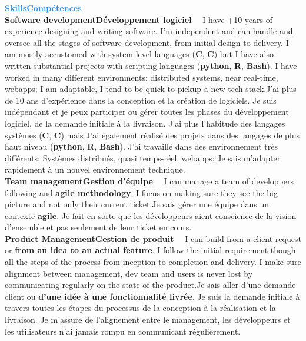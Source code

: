 \documentclass[a4paper]{article}
\newcommand\enfr[2]{\ifdefined\doen#1\else#2\fi\xspace}
\newcommand\cpplang{\textbf{C\raisebox{0.1em}{++}}\xspace}
\newcommand\clang{\textbf{C}\xspace}
\newcommand\rlang{\textbf{R}\xspace}
\newcommand\python{\textbf{python}\xspace}
\newcommand\bash{\textbf{Bash}\xspace}
\newcommand\heading[1]{\Large\textsf{\textbf{\textcolor{DodgerBlue}{#1}}}\normalsize}
\newcommand\sideentry[1]{\normalsize\textbf{#1}~~}
\begin{document}
\begin{minipage}[t]{0.29\textwidth}
  \heading{\enfr{Skills}{Compétences}}\\

  \sideentry{\enfr{Software development}{Développement logiciel}}
  \enfr{I have +10 years of experience designing and writing
    software. I'm independent and can handle and oversee all the
    stages of software development, from initial design to delivery. I
    am mostly accustomed with system-level languages (\clang,
    \cpplang) but I have also written substantial projects with
    scripting languages (\python, \rlang, \bash). I have worked in
    many different environments: distributed systems, near real-time,
    webapps; I am adaptable, I tend to be quick to pickup a new tech
    stack.}
    {J'ai plus de 10 ans d’expérience dans la conception et
    la création de logiciels. Je suis indépendant et je peux
    participer ou gérer toutes les phases du développement logiciel,
    de la demande initiale à la livraison. J'ai plus l'habitude des
    langages systèmes (\clang, \cpplang) mais J'ai également réalisé
    des projets dans des langages de plus haut niveau (\python, \rlang,
    \bash). J'ai travaillé dans des environnement très différents:
    Systèmes distribués, quasi temps-réel, webapps; Je sais m'adapter
    rapidement à un nouvel environnement technique.}\\

    \sideentry{\enfr{Team management}{Gestion d'équipe}}
    \enfr{I can manage a team of developpers
  following and \textbf{agile methodology}; I focus on making sure
  they see the big picture and not only their current ticket.}
    {Je sais gérer une équipe dans un contexte \textbf{agile}. Je
      fait en sorte que les développeurs aient conscience de la
      vision d'ensemble et pas seulement de leur ticket en cours.}\\
 
    \sideentry{\enfr{Product Management}{Gestion de produit}}
    \enfr{I can build from a client
  request or \textbf{from an idea to an actual feature}. I follow the
  initial requirement though all the steps of the process from
  inception to completion and delivery. I make sure alignment between
  management, dev team and users is never lost by communicating
  regularly on the state of the product.}
    {Je sais aller d'une demande client ou \textbf{d'une idée à une
        fonctionnalité livrée}. Je suis la demande initiale à travers
      toutes les étapes du processus de la conception à la réalisation
      et la livraison. Je m'assure de l'alignement entre le
      management, les développeurs et les utilisateurs n'ai jamais
      rompu en communicant régulièrement.}\\


\end{minipage}
\end{document}
